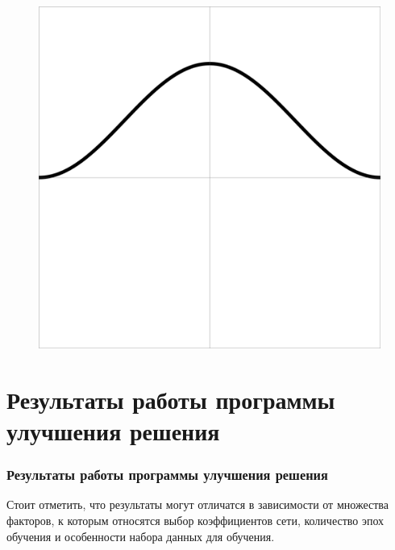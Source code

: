 \documentclass{beamer}
\begin{document}
\begin{frame}
\begin{figure}
\begin{minipage}{0.35\textwidth}
				\includegraphics[width=\textwidth]{test4}
				\label{fig:second}
			\end{minipage}
		\end{figure}
\end{frame}

\section{Результаты работы программы улучшения решения}
\begin{frame}
\frametitle{Результаты работы программы улучшения решения}


\begin{table}[ht!]
	\caption{Результаты точности работы программы}
	\centering
\end{table}	
Стоит отметить, что результаты могут отличатся в зависимости от множества факторов, к которым относятся выбор коэффициентов сети, количество эпох обучения и особенности набора данных для обучения.
\end{frame}
\end{document}

